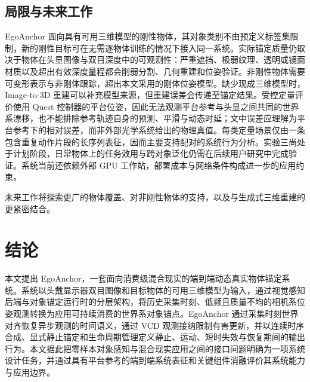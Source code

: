 \documentclass[review]{vgtc}
\begin{document}
\subsection{局限与未来工作}


EgoAnchor 面向具有可用三维模型的刚性物体，其对象类别不由预定义标签集限制，新的刚性目标可在无需逐物体训练的情况下接入同一系统。实际锚定质量仍取决于物体在头显图像与双目深度中的可观测性：严重遮挡、极弱纹理、透明或镜面材质以及超出有效深度量程都会削弱分割、几何重建和位姿验证。非刚性物体需要可变形表示与非刚体跟踪，超出本文采用的刚体位姿模型。缺少现成三维模型时，Image-to-3D 重建可以补充模型来源，但重建误差会传递至锚定结果。受控定量评价使用 Quest 控制器的平台位姿，因此无法观测平台参考与头显之间共同的世界系漂移，也不能排除参考轨迹自身的预测、平滑与动态时延；文中误差应理解为平台参考下的相对误差，而非外部光学系统给出的物理真值。每类定量场景仅由一条包含重复动作片段的长序列表征，因而主要支持配对的系统行为分析。实验三尚处于计划阶段，日常物体上的任务效用与跨对象泛化仍需在后续用户研究中完成验证。系统当前还依赖外部 GPU 工作站，部署成本与网络条件构成进一步的应用约束。

未来工作将探索更广的物体覆盖、对非刚性物体的支持，以及与生成式三维重建的更紧密结合。

\section{结论}\label{sec:conclusion}

本文提出 EgoAnchor，一套面向消费级混合现实的端到端动态真实物体锚定系统。系统以头戴显示器双目图像和目标物体的可用三维模型为输入，通过视觉感知后端与对象锚定运行时的分层架构，将历史采集时刻、低频且质量不均的相机系位姿观测转换为应用可持续消费的世界系对象锚点。EgoAnchor 通过采集时刻世界对齐恢复异步观测的时间语义，通过 VCD 观测接纳限制有害更新，并以连续时序合成、显式静止锚定和生命周期管理定义静止、运动、短时失效与恢复期间的输出行为。本文据此把零样本对象感知与混合现实应用之间的接口问题明确为一项系统设计任务，并通过具有平台参考的端到端系统表征和关键组件消融评价其系统能力与应用边界。




\end{document}

